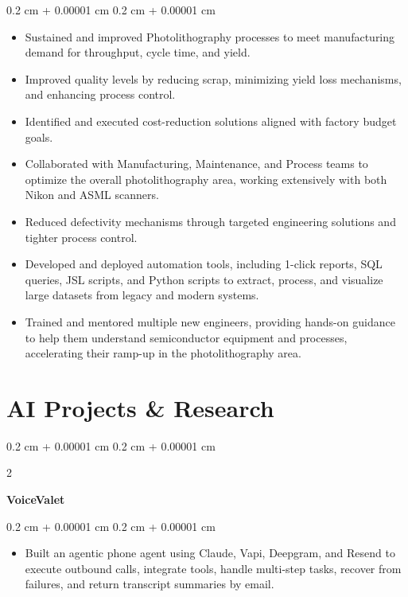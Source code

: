 \documentclass[10pt, letterpaper]{article}
\newenvironment{highlights}{
    \begin{itemize}[
        topsep=0.10 cm,
        parsep=0.10 cm,
        partopsep=0pt,
        itemsep=0pt,
        leftmargin=0.4 cm + 10pt
    ]
}{
    \end{itemize}
} %
\newenvironment{onecolentry}{
    \begin{adjustwidth}{
        0.2 cm + 0.00001 cm
    }{
        0.2 cm + 0.00001 cm
    }
}{
    \end{adjustwidth}
} %
\newenvironment{twocolentry}[2][]{
    \onecolentry
    \def\secondColumn{#2}
    \setcolumnwidth{\fill, 4.5 cm}
    \begin{paracol}{2}
}{
    \switchcolumn \raggedleft \secondColumn
    \end{paracol}
    \endonecolentry
} %
\let\hrefWithoutArrow\href
\renewcommand{\href}[2]{\hrefWithoutArrow{#1}{\ifthenelse{\equal{#2}{}}{ }{#2 }\raisebox{.15ex}{\footnotesize \faExternalLink*}}}
\begin{document}
        \vspace{0.10 cm}
        \begin{onecolentry}
            \begin{highlights}
                \item Sustained and improved Photolithography processes to meet manufacturing demand for throughput, cycle time, and yield.
                \item Improved quality levels by reducing scrap, minimizing yield loss mechanisms, and enhancing process control.
                \item Identified and executed cost-reduction solutions aligned with factory budget goals.
                \item Collaborated with Manufacturing, Maintenance, and Process teams to optimize the overall photolithography area, working extensively with both Nikon and ASML scanners.
                \item Reduced defectivity mechanisms through targeted engineering solutions and tighter process control.
                \item Developed and deployed automation tools, including 1-click reports, SQL queries, JSL scripts, and Python scripts to extract, process, and visualize large datasets from legacy and modern systems.
                \item Trained and mentored multiple new engineers, providing hands-on guidance to help them understand semiconductor equipment and processes, accelerating their ramp-up in the photolithography area.
        \end{highlights}
        \end{onecolentry}

    \section{AI Projects \& Research}

        \begin{twocolentry}{
        \textit{\href{https://github.com/HectorHernandez1/VoiceValet}{GitHub}}}
            \textbf{VoiceValet}
        \end{twocolentry}
        \vspace{0.10 cm}
        \begin{onecolentry}
            \begin{highlights}
                \item Built an agentic phone agent using Claude, Vapi, Deepgram, and Resend to execute outbound calls, integrate tools, handle multi-step tasks, recover from failures, and return transcript summaries by email.
            \end{highlights}
        \end{onecolentry}
\end{document}
